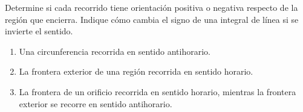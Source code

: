 Determine si cada recorrido tiene orientación positiva o negativa respecto de la región que encierra. Indique cómo cambia el signo de una integral de línea si se invierte el sentido.
\begin{enumerate}
    \item Una circunferencia recorrida en sentido antihorario.
    \item La frontera exterior de una región recorrida en sentido horario.
    \item La frontera de un orificio recorrida en sentido horario, mientras la frontera exterior se recorre en sentido antihorario.
\end{enumerate}
